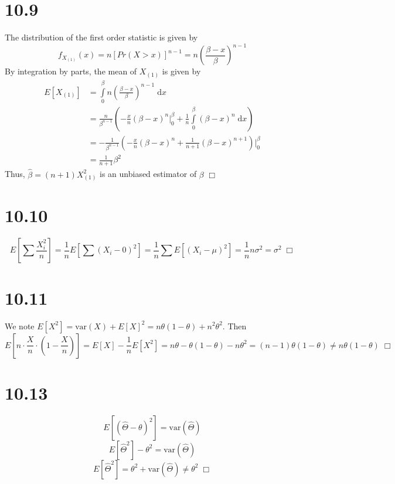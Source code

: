 \documentclass{article}
\begin{document}
\section*{10.9}
The distribution of the first order statistic is given by
$$f_{X_{(1)}}(x) = n \left[Pr(X > x)\right]^{n-1} = n \left(\frac{\beta-x}{\beta}\right)^{n-1} $$
By integration by parts, the mean of $X_{(1)}$ is given by
\begin{equation*}
\begin{split}
  E[X_{(1)}] &= \int\limits_0^\beta n \left(\frac{\beta-x}{\beta}\right)^{n-1} \; \mathrm{d}x\\
  &= \frac{n}{\beta^{n-1}} \left(-\frac{x}{n}(\beta - x)^n\Big\rvert_0^\beta + \frac{1}{n}\int\limits_0^\beta (\beta - x)^n \; \mathrm{d}x \right)\\
  &= -\frac{1}{\beta^{n-1}} \left(-\frac{x}{n}(\beta - x)^n + \frac{1}{n+1}(\beta - x)^{n+1} \right) \Big\rvert_0^\beta\\
  &= \frac{1}{n+1}\beta^2
\end{split}
\end{equation*}
Thus, $\hat{\beta} = (n+1)X_{(1)}^2$ is an unbiased estimator of $\beta$ $\Box$

\section*{10.10}
$$E[\sum \frac{X_i^2}{n}] = \frac{1}{n}E[\sum (X_i - 0)^2] = \frac{1}{n} \sum E[(X_i - \mu)^2] = \frac{1}{n}n\sigma^2 = \sigma^2 \; \Box$$

\section*{10.11}
We note $E[X^2] = \mathrm{var}(X) + E[X]^2 = n\theta(1-\theta) + n^2\theta^2$. Then
$$E\left[n\cdot \frac{X}{n} \cdot (1- \frac{X}{n})\right] = E[X] - \frac{1}{n} E[X^2] = n\theta - \theta(1-\theta) - n\theta^2 = (n-1)\theta(1-\theta) \neq n\theta(1-\theta) \; \Box$$

\section*{10.13}
$$E[(\hat{\Theta}-\theta)^2] = \mathrm{var}(\hat{\Theta})$$
$$E[\hat{\Theta}^2] - \theta^2 = \mathrm{var}(\hat{\Theta})$$
$$E[\hat{\Theta}^2] = \theta^2 + \mathrm{var}(\hat{\Theta}) \neq \theta^2 \; \Box$$
\end{document}
